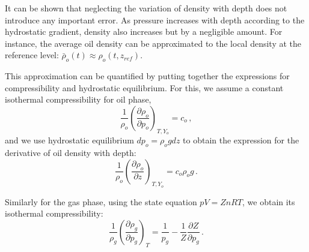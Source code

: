 \documentclass[authoryear,preprint,review,11pt]{elsarticle}
\begin{document}
It can be shown that neglecting the variation of density with depth does not introduce any important error. As pressure increases with depth according to the hydrostatic gradient, density also increases but by a negligible amount. For instance, the average oil density can be approximated to the local density at the reference level: $\bar{\rho}_o (t) \approx \rho_o (t, z_{ref})$.



%
%
%
%
%
%
%
%
%

This approximation can be quantified by putting together the expressions for compressibility and hydrostatic equilibrium. For this, we assume a constant isothermal compressibility for oil phase,
\begin{equation}\label{eq: grado}
\frac{1}{\rho_o}\left(\frac{\partial \rho_o}{\partial p_o} \right)_{T,Y_o} = c_o \, ,
\end{equation}
 and we use hydrostatic equilibrium $dp_o = \rho_o g dz$ to obtain the expression for the derivative of oil density with depth:
\begin{equation}\label{eq: gradodz}
 \frac{1}{\rho_o}\left(\frac{\partial \rho_o}{\partial z} \right)_{T,Y_o} = c_o \rho_o g \, .
\end{equation}

Similarly for the gas phase, using the state equation $pV = Zn R T$, we obtain its isothermal compressibility:
\begin{equation}
\frac{1}{\rho_g}\left(\frac{\partial \rho_g}{\partial p_g}\right)_{T} = \frac{1}{p_g}-\frac{1}{Z}\frac{\partial Z}{\partial p_g} \, .
\end{equation}
\end{document}
